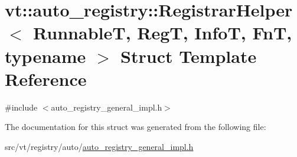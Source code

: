 \hypertarget{structvt_1_1auto__registry_1_1_registrar_helper}{}\section{vt\+:\+:auto\+\_\+registry\+:\+:Registrar\+Helper$<$ RunnableT, RegT, InfoT, FnT, typename $>$ Struct Template Reference}
\label{structvt_1_1auto__registry_1_1_registrar_helper}


{\ttfamily \#include $<$auto\+\_\+registry\+\_\+general\+\_\+impl.\+h$>$}



The documentation for this struct was generated from the following file\+:\begin{DoxyCompactItemize}
\item 
src/vt/registry/auto/\hyperlink{auto__registry__general__impl_8h}{auto\+\_\+registry\+\_\+general\+\_\+impl.\+h}\end{DoxyCompactItemize}
